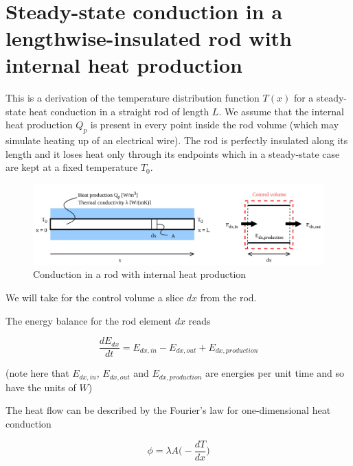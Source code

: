 \documentclass[10pt]{article}
\begin{document}
\newpage

\tableofcontents

\newpage

\setlength{\parskip}{0.6em}
\setlength{\parindent}{0cm}


\,\,\,

\normalsize

\section{Steady-state conduction in a lengthwise-insulated rod with internal heat production}

This is a derivation of the temperature distribution function $T(x)$ for a steady-state heat conduction in a straight rod of length $L$. We assume that the internal heat production $Q_p$ is present in every point inside the rod volume (which may simulate heating up of an electrical wire). The rod is perfectly insulated along its length and it loses heat only through its endpoints which in a steady-state case are kept at a fixed temperature $T_0$.

\begin{figure}[H]
\centering\includegraphics[width=16cm]{Conduction_rod.jpg}
\caption{Conduction in a rod with internal heat production}
\label{fig:conduction}
\end{figure}

We will take for the control volume a slice $dx$ from the rod. 

The energy balance for the rod element $dx$ reads

\begin{equation}
\frac{dE_{dx}}{dt} = E_{dx, in} - E_{dx, out} + E_{dx, production}
\end{equation}

(note here that $E_{dx, in}$, $E_{dx, out}$ and $E_{dx, production}$ are energies per unit time and so have the units of $W$)

The heat flow can be described by the Fourier's law for one-dimensional heat conduction

\begin{equation}
\phi = \lambda A \Big(- \frac{dT}{dx} \Big)
\label{eq:fourier}
\end{equation}
\end{document}
